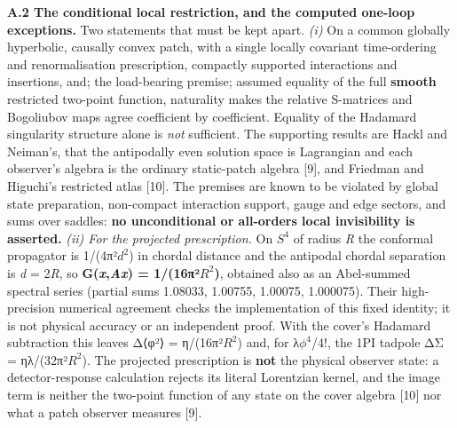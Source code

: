 \documentclass[
]{article}
\begin{document}
\textbf{A.2 The conditional local restriction, and the computed one-loop
exceptions.} Two statements that must be kept apart. \emph{(i)} On a
common globally hyperbolic, causally convex patch, with a single locally
covariant time-ordering and renormalisation prescription, compactly
supported interactions and insertions, and; the load-bearing premise;
assumed equality of the full \textbf{smooth} restricted two-point
function, naturality makes the relative S-matrices and Bogoliubov maps
agree coefficient by coefficient. Equality of the Hadamard singularity
structure alone is \emph{not} sufficient. The supporting results are
Hackl and Neiman's, that the antipodally even solution space is
Lagrangian and each observer's algebra is the ordinary static-patch
algebra {[}9{]}, and Friedman and Higuchi's restricted atlas {[}10{]}.
The premises are known to be violated by global state preparation,
non-compact interaction support, gauge and edge sectors, and sums over
saddles: \textbf{no unconditional or all-orders local invisibility is
asserted.} \emph{(ii) For the projected prescription.} On \(S^4\) of
radius \emph{R} the conformal propagator is 1/(4π²\(d^2\)) in chordal
distance and the antipodal chordal separation is \emph{d} = 2\emph{R},
so \textbf{G(\emph{x},\emph{Ax}) = 1/(16π²\(R^2\))}, obtained also as an
Abel-summed spectral series (partial sums 1.08033, 1.00755, 1.00075,
1.000075). Their high-precision numerical agreement checks the
implementation of this fixed identity; it is not physical accuracy or an
independent proof. With the cover's Hadamard subtraction this leaves
Δ⟨φ²⟩ = η/(16π²\(R^2\)) and, for λ\(\phi^4\)/4!, the 1PI tadpole ΔΣ =
ηλ/(32π²\(R^2\)). The projected prescription is \textbf{not} the
physical observer state: a detector-response calculation rejects its
literal Lorentzian kernel, and the image term is neither the two-point
function of any state on the cover algebra {[}10{]} nor what a patch
observer measures {[}9{]}.
\end{document}
